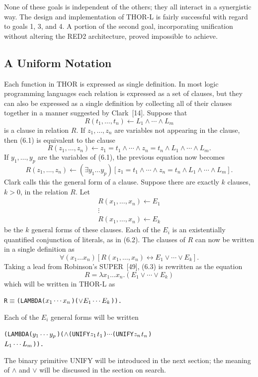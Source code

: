 None of these goals is independent of the others; they all interact in a
synergistic way. The design and implementation of THOR-L is fairly successful
with regard to goals 1, 3, and 4. A portion of the second goal, incorporating
unification without altering the RED2 architecture, proved impossible to
achieve.

\subsection{A Uniform Notation}

Each function in THOR is expressed as single definition. In most logic
programming languages each relation is expressed as a set of clauses, but they
can also be expressed as a single definition by collecting all of their clauses
together in a manner suggested by Clark~[14]. Suppose that
\[
R(t_1,\ldots,t_n)\leftarrow L_1\wedge\cdots\wedge L_m
\tag{6.1}
\]
is a clause in relation \(R\). If \(z_1,\ldots,z_n\) are variables not appearing
in the clause, then (6.1) is equivalent to the clause
\[
R(z_1,\ldots,z_n)\leftarrow z_1=t_1\wedge\cdots\wedge z_n=t_n
\wedge L_1\wedge\cdots\wedge L_m.
\]
If \(y_1,\ldots,y_p\) are the variables of (6.1), the previous equation now
becomes
\[
R(z_1,\ldots,z_n)\leftarrow
(\exists y_1\ldots y_p)[z_1=t_1\wedge\cdots\wedge z_n=t_n
\wedge L_1\wedge\cdots\wedge L_m].
\tag{6.2}
\]
Clark calls this the general form of a clause. Suppose there are exactly \(k\)
clauses, \(k>0\), in the relation \(R\). Let
\[
\begin{array}{c}
R(x_1,\ldots,x_n)\leftarrow E_1\\
\vdots\\
R(x_1,\ldots,x_n)\leftarrow E_k
\end{array}
\]
be the \(k\) general forms of these clauses. Each of the \(E_i\) is an
existentially quantified conjunction of literals, as in (6.2). The clauses of
\(R\) can now be written in a single definition as
\[
\forall(x_1\ldots x_n)[R(x_1,\ldots,x_n)\leftrightarrow E_1\vee\cdots\vee E_k].
\tag{6.3}
\]
Taking a lead from Robinson's SUPER~[49], (6.3) is rewritten as the equation
\[
R=\lambda x_1\ldots x_n.(E_1\vee\cdots\vee E_k)
\]
which will be written in THOR-L as
\begin{alltt}
R \(\equiv\) (LAMBDA (\(x\sb{1} \cdots x\sb{n}\)) (\(\vee\) \(E\sb{1} \cdots E\sb{k}\))).
\end{alltt}
Each of the \(E_i\) general forms will be written
\begin{alltt}
(LAMBDA (\(y\sb{1} \cdots y\sb{p}\)) (\(\wedge\) (UNIFY \(z\sb{1}\) \(t\sb{1}\)) \(\cdots\) (UNIFY \(z\sb{n}\) \(t\sb{n}\))
                     \(L\sb{1} \cdots L\sb{m}\))).
\end{alltt}
The binary primitive UNIFY will be introduced in the next section; the meaning
of \(\wedge\) and \(\vee\) will be discussed in the section on search.

